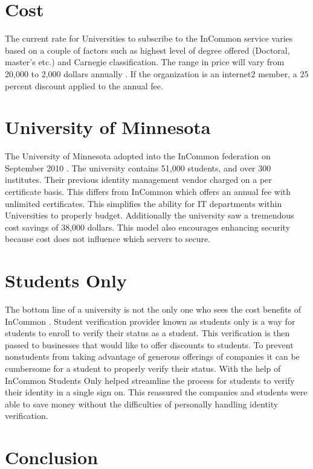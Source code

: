 \documentclass[9pt,twocolumn,twoside]{../../styles/osajnl}
\begin{document}
\section{Cost}

The current rate for Universities to subscribe to the InCommon service
varies based on a couple of factors such as highest level of degree
offered (Doctoral, master’s etc.) and Carnegie classification.  The
range in price will vary from 20,000 to 2,000 dollars annually
\cite{www-price}.  If the organization is an internet2 member, a 25
percent discount applied to the annual fee.

\section{University of Minnesota}

The University of Minnesota adopted into the InCommon federation on
September 2010 \cite{www-casestudy1}.  The university contains 51,000
students, and over 300 institutes.  Their previous identity management
vendor charged on a per certificate basis.  This differs from InCommon
which offers an annual fee with unlimited certificates.  This
simplifies the ability for IT departments within Universities to
properly budget.  Additionally the university saw a tremendous cost
savings of 38,000 dollars.  This model also encourages enhancing
security because cost does not influence which servers to secure.

\section{Students Only}

The bottom line of a university is not the only one who sees the cost
benefits of InCommon \cite{www-casestudy2}.  Student verification
provider known as students only is a way for students to enroll to
verify their status as a student.  This verification is then passed to
businesses that would like to offer discounts to students.  To prevent
nonstudents from taking advantage of generous offerings of companies
it can be cumbersome for a student to properly verify their status.
With the help of InCommon Students Only helped streamline the process
for students to verify their identity in a single sign on.  This
reassured the companies and students were able to save money without
the difficulties of personally handling identity verification.

\section{Conclusion}
\end{document}

